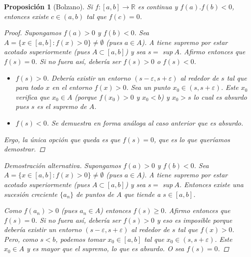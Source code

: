 \documentclass[]{article}
\newtheorem{prop}[teo]{Proposición}
\def\R{\mathbb{R}}
\def\e{\varepsilon}
\begin{document}
\begin{prop}[Bolzano]
	Si $f:[a,b] \to \R$ es continua y $f(a).f(b) < 0$, entonces existe $c \in (a,b)$ tal que $f(c) = 0$.
	\begin{proof}
		Supongamos $f(a) > 0$ y $f(b) < 0$. Sea $A = \{x\in [a,b]: f(x) > 0\} \neq \emptyset$ (pues $a \in A$). A tiene supremo por estar acotado superiormente (pues $A \subset [a,b]$) y sea $s = $ sup$\ A$. Afirmo entonces que $f(s) = 0$. Si no fuera así, debería ser $f(s)>0$ o $f(s)<0$.
		\begin{itemize}
	 		\item $f(s) > 0$. Debería existir un entorno $(s-\e , s+\e)$ al rededor de $s$ tal que para todo $x$ en el entorno $f(x) > 0$. Sea un punto $x_0 \in (s,s+\e)$. Este $x_0$ verifica que $x_0 \in A$ (porque $f(x_0) > 0$ y $x_0 < b$) y $x_0 > s$ lo cual es absurdo pues $s$ es el supremo de $A$.
			\item $f(s) < 0$. Se demuestra en forma análoga al caso anterior que es absurdo.
		\end{itemize}
		Ergo, la única opción que queda es que $f(s) = 0$, que es lo que queríamos demostrar.
	\end{proof}

	\begin{proof}[Demostración alternativa]
		Supongamos $f(a) > 0$ y $f(b) < 0$. Sea $A = \{x\in [a,b]: f(x) > 0\} \neq \emptyset$ (pues $a \in A$). A tiene supremo por estar acotado superiormente (pues $A \subset [a,b]$) y sea $s = $ sup$\ A$. Entonces existe una sucesión creciente $\{a_n\}$ de puntos de $A$ que tiende a $s \in [a,b]$.
		
		Como $f(a_n) > 0$ (pues $a_n \in A$) entonces $f(s) \geq 0$. Afirmo entonces que $f(s) = 0$. Si no fuera así, debería ser $f(s)>0$ y eso es imposible porque debería existir un entorno $(s-\e , s+\e)$ al rededor de $s$ tal que $f(x) > 0$. Pero, como $s < b$, podemos tomar $x_0 \in [a,b]$ tal que $x_0 \in (s,s+\e)$. Este $x_0 \in A$ y es mayor que el supremo, lo que es absurdo. O sea $f(s) = 0$.
	\end{proof}
\end{prop}
\end{document}
